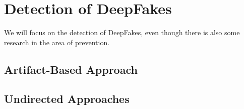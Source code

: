 \section{Detection of DeepFakes}
We will focus on the detection of DeepFakes, even though there is also some research in the area of
prevention.

\subsection{Artifact-Based Approach}

\subsection{Undirected Approaches}
